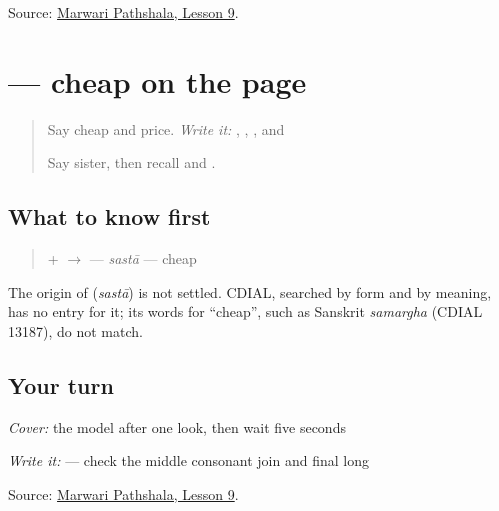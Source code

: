 \begin{tcolorbox}[breakable,colback=teal!4,colframe=teal!35!black,title={Before you move on}]
Source: \href{https://www.marwaripathshala.com/marwari-lesson-9-english}{Marwari Pathshala, Lesson 9}.
\end{tcolorbox}
\section[\texorpdfstring{\mw{सस्ता} (sastā)}{सस्ता (sastā)}]{ — cheap on the page}

\label{lesson:MW-C14-sasta}



\begin{quote}
Say cheap and price. \emph{Write it:} \textbf{}, \textbf{}, \textbf{}, and \textbf{}

Say sister, then recall \textbf{} and \textbf{}.
\end{quote}

\subsection*{What to know first}
\begin{quote}
\textbf{} + \textbf{} $\to$ \textbf{} — \emph{sastā} — cheap
\end{quote}

\begin{cousinweb}
The origin of \textbf{} (\emph{sastā}) is not settled. CDIAL, searched by form and by meaning, has no entry for it; its words for \textquotedblleft{}cheap\textquotedblright{}, such as Sanskrit \emph{samargha} (CDIAL 13187), do not match.
\end{cousinweb}

\subsection*{Your turn}
\emph{Cover:} the model after one look, then wait five seconds

\emph{Write it:} \textbf{} — check the middle consonant join and final long \textbf{}

\begin{tcolorbox}[breakable,colback=teal!4,colframe=teal!35!black,title={Before you move on}]
Source: \href{https://www.marwaripathshala.com/marwari-lesson-9-english}{Marwari Pathshala, Lesson 9}.
\end{tcolorbox}
